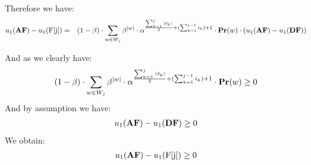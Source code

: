 Therefore we have: 
\begin{eqnarray*}
u_1(\text{\rm {\bf AF}}) - u_1(\text{\rm F[{j}]}) & = & (1-\beta)\cdot\sum_{w \in W_j}  \beta^{|w|}\cdot \alpha^{\frac{\sum_{k=1}^{j} |d_k|}{2}+(\sum_{k=1}^{j-1} i_k) +1} \cdot \mathbf{Pr}(w) \cdot (u_1(\text{\rm {\bf AF}}) - u_1(\text{\rm {\bf DF}}))
\end{eqnarray*}

And as we clearly have:
\begin{eqnarray*}
(1-\beta)\cdot\sum_{w \in W_j}  \beta^{|w|}\cdot \alpha^{\frac{\sum_{k=1}^{j} |d_k|}{2}+(\sum_{k=1}^{j-1} i_k) +1} \cdot \mathbf{Pr}(w) \geq 0
\end{eqnarray*}
And by assumption we have:
\begin{eqnarray*}
u_1(\text{\rm {\bf AF}}) - u_1(\text{\rm {\bf DF}}) \geq 0
\end{eqnarray*}
We obtain:
\begin{eqnarray*}
u_1(\text{\rm {\bf AF}}) - u_1(\text{\rm F[{j}]}) \geq 0
\end{eqnarray*}
 




